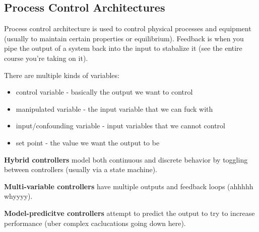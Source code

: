\documentclass{article}
\begin{document}
\subsection*{Process Control Architectures} %
\label{sub:process_control_architectures}
Process control architecture is used to control physical processes and equipment (usually to maintain certain properties or equilibrium). Feedback is when you pipe the output of a system back into the input to stabalize it (see the entire course you're taking on it).

There are multiple kinds of variables:
\begin{itemize}
    \item control variable - basically the output we want to control
    \item manipulated variable - the input variable that we can fuck with
    \item input/confounding variable - input variables that we cannot control
    \item set point - the value we want the output to be
\end{itemize}

\textbf{Hybrid controllers} model both continuous and discrete behavior by toggling between controllers (usually via a state machine).

\textbf{Multi-variable controllers} have multiple outputs and feedback loops (ahhhhh whyyyy).

\textbf{Model-predicitve controllers} attempt to predict the output to try to increase performance (uber complex caclucations going down here).

\end{document}

